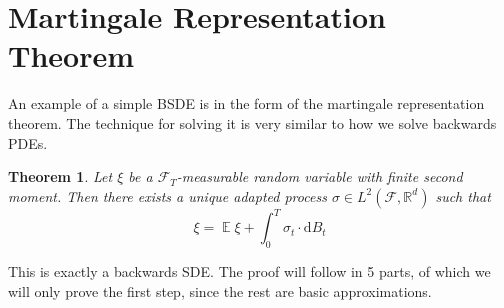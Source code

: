 \documentclass{amsart}
\newcommand{\rr}{\mathbb R}    %
\newcommand{\cF}{\mathcal{F}}
\DeclareMathOperator{\ee}{\mathbb E}
\newtheorem{theorem}{Theorem}
\theoremstyle{definition}
\theoremstyle{remark}
\numberwithin{equation}{section}
\begin{document}
\section{Martingale Representation Theorem}
An example of a simple BSDE is in the form of the martingale representation theorem. The technique for solving it is very similar to how we solve backwards PDEs. 
\begin{theorem}
    Let $\xi$ be a $\cF_T$-measurable random variable with finite second moment. Then there exists a unique adapted process $\sigma \in L^2(\cF, \rr^d)$ such that 
    \begin{equation}
        \xi = \ee \xi + \int_0^T \sigma_t \cdot \mathrm{d}B_t
    \end{equation}
\end{theorem}
This is exactly a backwards SDE. The proof will follow in 5 parts, of which we will only prove the first step, since the rest are basic approximations. 
\end{document}
